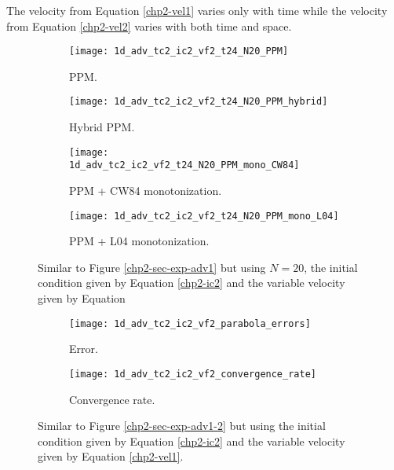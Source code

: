 The velocity from Equation \eqref{chp2-vel1} varies only with time 
while the velocity from Equation \eqref{chp2-vel2} varies with both time and space.
\newpage

\begin{figure}[!htb]
  \centering
  \begin{subfigure}{0.49\textwidth}
    \centering
			\texttt{[image: 1d\_adv\_tc2\_ic2\_vf2\_t24\_N20\_PPM]}
			\caption{PPM.\label{chp2-sec-exp-adv4-a}}
  \end{subfigure}
  \begin{subfigure}{0.49\textwidth}
    \centering
			\texttt{[image: 1d\_adv\_tc2\_ic2\_vf2\_t24\_N20\_PPM\_hybrid]}
			\caption{Hybrid PPM.\label{chp2-sec-exp-adv4-b}}
  \end{subfigure}

  \begin{subfigure}{0.49\textwidth}
    \centering
		\texttt{[image: 1d\_adv\_tc2\_ic2\_vf2\_t24\_N20\_PPM\_mono\_CW84]}
    \caption{PPM + CW84 monotonization.\label{chp2-sec-exp-adv4-c}}
  \end{subfigure}
  \begin{subfigure}{0.49\textwidth}
    \centering
			\texttt{[image: 1d\_adv\_tc2\_ic2\_vf2\_t24\_N20\_PPM\_mono\_L04]}
      \caption{PPM + L04 monotonization.\label{chp2-sec-exp-adv4-d}}
  \end{subfigure} 
	\caption{ Similar to Figure \ref{chp2-sec-exp-adv1} but using $N=20$, the initial
	condition given by Equation \eqref{chp2-ic2} and the variable velocity given by Equation 
	\label{chp2-sec-exp-adv4}}
\end{figure}

\begin{figure}[!htb]
  \centering
  \begin{subfigure}{0.49\textwidth}
    \centering
		\texttt{[image: 1d\_adv\_tc2\_ic2\_vf2\_parabola\_errors]}
		\caption{Error.\label{chp2-sec-exp-adv4-error}}
  \end{subfigure}
  \begin{subfigure}{0.49\textwidth}
    \centering
			\texttt{[image: 1d\_adv\_tc2\_ic2\_vf2\_convergence\_rate]}
		\caption{Convergence rate.\label{chp2-sec-exp-adv4-CR}}
  \end{subfigure}
	\caption{ Similar to Figure \ref{chp2-sec-exp-adv1-2} but using
	the initial condition given by Equation	\eqref{chp2-ic2} and the variable 
	velocity given by Equation \eqref{chp2-vel1}.\label{chp2-sec-exp-adv4-2}}
\end{figure}



